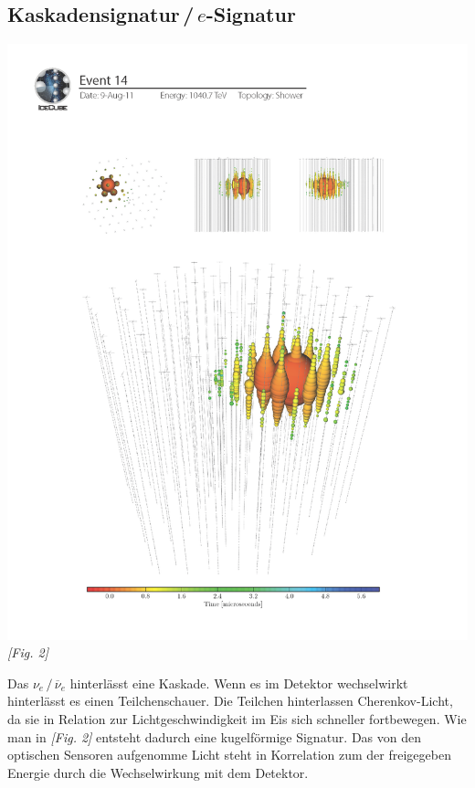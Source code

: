 \subsection{Kaskadensignatur\,/\,$e$-Signatur}
\begin{center}
    \includegraphics[scale=0.45]{images/cascade.png} \\
    \textit{[Fig. 2]}
\end{center}
Das $\nu_e \,/\, \overline{\nu}_e$ hinterlässt eine Kaskade. Wenn es im Detektor wechselwirkt hinterlässt es einen Teilchenschauer.
Die Teilchen hinterlassen Cherenkov-Licht,  da sie in Relation zur Lichtgeschwindigkeit im Eis sich schneller fortbewegen.
Wie man in \textit{[Fig. 2]} entsteht dadurch eine kugelförmige Signatur. Das von den optischen Sensoren aufgenomme
Licht steht in Korrelation zum der freigegeben Energie durch die Wechselwirkung mit dem Detektor. \cite{Halzen2012}
\newpage


